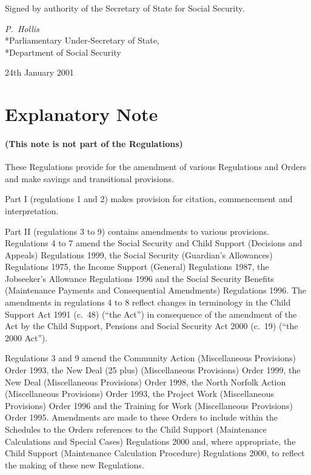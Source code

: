 \documentclass[12pt,a4paper]{article}
\begin{document}
\bigskip

Signed 
by authority of the Secretary of State for Social Security.

{\raggedleft
\emph{P.~Hollis}\\*Parliamentary Under-Secretary of State,\\*Department of Social Security

}

24th January 2001

\small

\part{Explanatory Note}

\renewcommand\parthead{— Explanatory Note}

\subsection*{(This note is not part of the Regulations)}

These Regulations provide for the amendment of various Regulations and Orders and make savings and transitional provisions.

Part I (regulations 1 and 2) makes provision for citation, commencement and interpretation.

Part II (regulations 3 to 9) contains amendments to various provisions. Regulations 4 to 7 amend the Social Security and Child Support (Decisions and Appeals) Regulations 1999, the Social Security (Guardian’s Allowances) Regulations 1975, the Income Support (General) Regulations 1987, the Jobseeker’s Allowance Regulations 1996 and the Social Security Benefits (Maintenance Payments and Consequential Amendments) Regulations 1996. The amendments in regulations 4 to 8 reflect changes in terminology in the Child Support Act 1991 (c.\ 48) (“the Act”) in consequence of the amendment of the Act by the Child Support, Pensions and Social Security Act 2000 (c.\ 19) (“the 2000 Act”).

Regulations 3 and 9 amend the Community Action (Miscellaneous Provisions) Order 1993, the New Deal (25 plus) (Miscellaneous Provisions) Order 1999, the New Deal (Miscellaneous Provisions) Order 1998, the North Norfolk Action (Miscellaneous Provisions) Order 1993, the Project Work (Miscellaneous Provisions) Order 1996 and the Training for Work (Miscellaneous Provisions) Order 1995. Amendments are made to these Orders to include within the Schedules to the Orders references to the Child Support (Maintenance Calculations and Special Cases) Regulations 2000 and, where appropriate, the Child Support (Maintenance Calculation Procedure) Regulations 2000, to reflect the making of these new Regulations.
\end{document}
